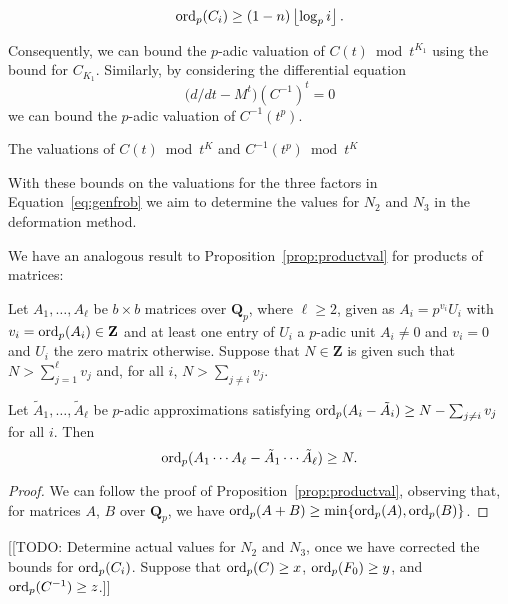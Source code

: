 \begin{thm}
\begin{equation*}
\operatorname{ord}_p(C_i) \geq (1 - n) \left\lfloor\log_p{i}\right\rfloor.
\end{equation*}
\end{thm}

Consequently, we can bound the $p$-adic valuation of $C(t) \bmod t^{K_1}$ 
using the bound for $C_{K_1}$.  Similarly, by considering the differential 
equation 
\begin{equation*}
\bigl(d/dt - M^t\bigr) (C^{-1})^t = 0
\end{equation*}
we can bound the $p$-adic valuation of $C^{-1}(t^p)$.
\begin{cor}
The valuations of $C(t) \bmod{t^K}$ and $C^{-1}(t^p) \bmod{t^K}$ 
\end{cor}

With these bounds on the valuations for the three factors in 
Equation~\eqref{eq:genfrob} we aim to determine the values for 
$N_2$ and $N_3$ in the deformation method.

We have an analogous result to Proposition~\ref{prop:productval} 
for products of matrices:

\begin{prop} \label{prop:matrixproductval}
Let $A_1, \dotsc, A_{\ell}$ be $b \times b$ matrices over $\mathbf{Q}_p$, 
where $\ell \geq 2$, given as $A_i = p^{v_i} U_i$ with 
$v_i = \operatorname{ord}_p(A_i) \in \mathbf{Z}$ and at least one entry of $U_i$ a 
$p$-adic unit $A_i \neq 0$ and $v_i = 0$ and $U_i$ the zero matrix 
otherwise.  Suppose that $N \in \mathbf{Z}$ is given such that 
$N > \sum_{j=1}^{\ell} v_j$ and, for all $i$, $N > \sum_{j \neq i} v_j$.

Let $\tilde{A}_1, \dotsc, \tilde{A}_{\ell}$ be $p$-adic approximations 
satisfying $\operatorname{ord}_p(A_i - \tilde{A}_i) \geq N - \sum_{j \neq i} v_j$ 
for all $i$.  Then 
\begin{equation*}
\operatorname{ord}_p(A_1 \dotsm A_{\ell} - \tilde{A}_1 \dotsm \tilde{A}_{\ell}) \geq N.
\end{equation*}
\end{prop}

\begin{proof}
We can follow the proof of Proposition~\ref{prop:productval}, 
observing that, for matrices $A$, $B$ over $\mathbf{Q}_p$, 
we have $\operatorname{ord}_p(A + B) \geq \min \{\operatorname{ord}_p(A), \operatorname{ord}_p(B)\}$.
\end{proof}

[[TODO:  Determine actual values for $N_2$ and $N_3$, once we have 
corrected the bounds for $\operatorname{ord}_p(C_i)$.  Suppose that 
$\operatorname{ord}_p(C) \geq x$, $\operatorname{ord}_p(F_0) \geq y$, and $\operatorname{ord}_p(C^{-1}) \geq z$.]]

